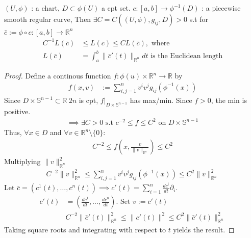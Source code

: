 \begin{lemma}
$\left(U, \phi \right)$ : a chart, $D \subset \phi(U)$ a cpt set.
$c : [a,b] \rightarrow \phi^{-1} (D)$ : a piecewise smooth regular curve, Then $\exists C = C\left( (U, \phi), g_{ij}, D \right) >0$ s.t 
for $\bar{c} := \phi \circ c :[a,b] \rightarrow \mathbb{R}^n$
\[
\begin{aligned}
    C^{-1} L(\bar{c}) &\leq L(c) \leq C L(\bar{c}), \text{ where}\\
    L(\bar{c}) &= \int_a^b \|\bar{c}'(t)\|_{\mathbb{R}^n} dt \text{ is the Euclidean length}
\end{aligned}
\]
\label{lemma:length_of_curve_in_chart}
\end{lemma}

\begin{proof}
    Define a continous function $f: \phi(u) \times \mathbb{R}^n \rightarrow \mathbb{R}$ by
    \[
    \begin{aligned}
        f(x,v) &:= \sum_{i,j = 1}^n v^i v^j g_{ij} (\phi^{-1}(x))
    \end{aligned}
    \]
    Since $D\times \mathbb{S}^{n-1} \subset \mathbb{R}~{2n}$ is cpt, $f|_{D \times \mathbb{S}^{n-1}}$ has max/min. Since $f>0$, the min is positive.
    \[
    \begin{aligned}
        \implies \exists C>0 \text{ s.t } c^{-2} \leq f \leq C^2 \text{ on } D \times \mathbb{S}^{n-1}
    \end{aligned}
    \]
    Thus, $\forall x \in D$ and $\forall v \in \mathbb{R}^n \setminus \{0\}:$
    \[
    \begin{aligned}
        C^{-2} \leq f\left(x, \frac{v}{\|v\|_{\mathbb{R}^n}} \right) \leq C^2
    \end{aligned}
    \]
    Multiplying $\|v\|^2_{\mathbb{R}^n}$
    \[
    \begin{aligned}
        C^{-2} \|v\|_{\mathbb{R}^n}^2 \leq \sum^n_{i,j=1} v^i v^j g_{ij}(\phi^{-1}(x)) \leq C^2 \|v\|_{\mathbb{R}^n}^2
    \end{aligned}
    \]
    Let $\bar{c} = \left(c^1(t), \dots, c^n(t)\right) \implies c'(t) = \sum^n_{i=1} \frac{dc^i}{dt} \partial_i$.
    \[
    \begin{aligned}
        \bar{c}'(t) &= \left(\frac{dc^1}{dt}, \dots, \frac{dc^n}{dt} \right). \text{ Set } v := \bar{c}'(t) \\
        &C^{-2} \| \bar{c}'(t)\|_{\mathbb{R}^n}^2 \leq \|c'(t)\|^2 \leq C^2 \|\bar{c}'(t)\|_{\mathbb{R}^n}^2
    \end{aligned}
    \]
    Taking square roots and integrating with respect to $t$ yields the result.
\end{proof}

